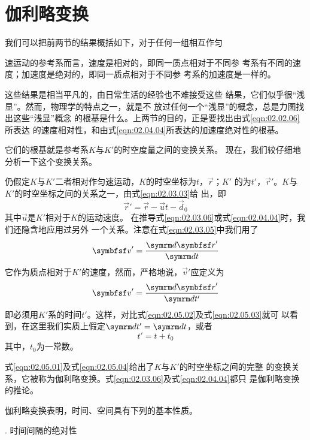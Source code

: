 \section{伽利略变换}\label{sec:02.05}

我们可以把前两节的结果概括如下，对于任何一组相互作匀

\noindent 速运动的参考系而言，速度是相对的，即同一质点相对于不同参
考系有不同的速度；加速度是绝对的，即同一质点相对于不同参
考系的加速度是一样的。

这些结果是相当平凡的，由日常生活的经验也不难接受这些
结果，它们似乎很“浅显”。然而，物理学的特点之一，就是不
放过任何一个“浅显”的概念，总是力图找出这些“浅显”概念
的根基是什么。上两节的目的，正是要找出由式\eqref{eqn:02.02.06}所表达
的速度相对性，和由式\eqref{eqn:02.04.04}所表达的加速度绝对性的根基。

它们的根基就是参考系$K$与$K'$的时空度量之间的变换关系。
现在，我们较仔细地分析一下这个变换关系。

仍假定$K$与$K'$二者相对作匀速运动，$K$的时空坐标为$t$，$\vec{r}$；$K'$
的为$t'$，$\vec{r}'$。$K$与$K'$的时空坐标之间的关系之一，由式\eqref{eqn:02.03.03}给
出，即
\begin{equation}\label{eqn:02.05.01}
    \vec{r}'=\vec{r}-\vec{u} t -\vec{d}_0
\end{equation}
其中$\vec{u}$是$K'$相对于$K$的运动速度。
在推导式\eqref{eqn:02.03.06}或式\eqref{eqn:02.04.04}时，我们还隐含地应用过另外
一个关系。注意在式\eqref{eqn:02.03.05}中我们用了
\begin{equation}\label{eqn:02.05.02}
    \vec{v}'=\frac{\dif \vec{r}'}{\dif t}
\end{equation}
它作为质点相对于$K'$的速度，然而，严格地说，$\vec{v}'$应定义为
\begin{equation}\label{eqn:02.05.03}
    \vec{v}'=\frac{\dif \vec{r}'}{\dif t'}
\end{equation}
即必须用$K'$系的时间$t'$。这样，对比式\eqref{eqn:02.05.02}及式\eqref{eqn:02.05.03}就可
以看到，在这里我们实质上假定$\dif t'=\dif t$，或者
\begin{equation}\label{eqn:02.05.04}
    t'=t+t_0
\end{equation}
其中，$t_0$为一常数。

式\eqref{eqn:02.05.01}及式\eqref{eqn:02.05.04}给出了$K$与$K'$的时空坐标之间的完整
的变换关系，它被称为伽利略变换。式\eqref{eqn:02.03.06}及式\eqref{eqn:02.04.04}都只
\clearpage
\noindent 是伽利略变换的推论。

伽利略变换表明，时间、空间具有下列的基本性质。

. 时间间隔的绝对性 \normalfont

